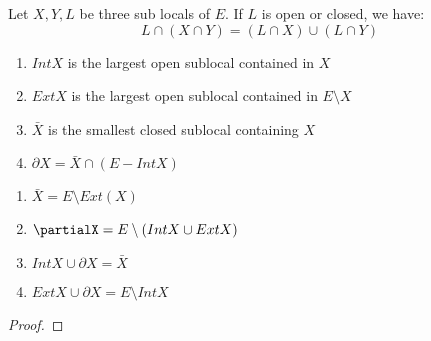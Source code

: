 \begin{lemma}
    \label{lem:distribution_of_intersections_over_unions}
    Let $X, Y, L$ be three sub locals of $E$. If $L$ is open or closed, we have:
    \[L \cap (X \cap Y) = (L \cap X) \cup (L \cap Y)\]
\end{lemma}

\begin{definition}
    \label{def:further_topology}
    \leanok
    \begin{enumerate}
        \item $Int X$ is the largest open sublocal contained in $X$
        \item $Ext X$ is the largest open sublocal contained in $E \setminus X$
        \item $\bar{X}$ is the smallest closed sublocal containing $X$
        \item $\partial X = \bar{X} \cap (E - Int X)$
    \end{enumerate}
\end{definition}

\begin{lemma} 
    \label{lem:properties_of_further_topology}
    \leanok
    \begin{enumerate}
        \item $\bar{X} = E \setminus Ext(X)$
        \item $\partialX = E \setminus (Int X \cup Ext X)$
        \item $Int X \cup \partial X = \bar X$
        \item $Ext X \cup \partial X = E \setminus Int X$
    \end{enumerate}
\end{lemma}

\begin{proof}
\end{proof}


